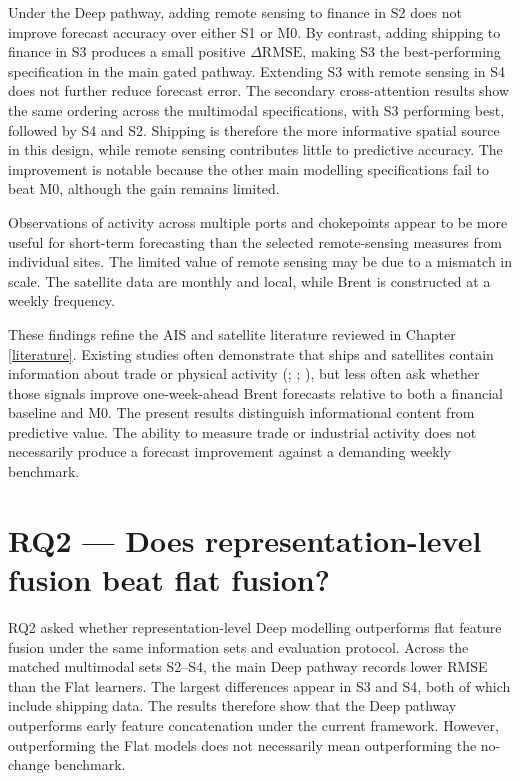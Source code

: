 \documentclass[
  british,
  12pt,
  oneside]{book}
\begin{document}
Under the Deep pathway, adding remote sensing to finance in S2 does not improve forecast accuracy over either S1 or M0. By contrast, adding shipping to finance in S3 produces a small positive \(\Delta\mathrm{RMSE}\), making S3 the best-performing specification in the main gated pathway. Extending S3 with remote sensing in S4 does not further reduce forecast error. The secondary cross-attention results show the same ordering across the multimodal specifications, with S3 performing best, followed by S4 and S2. Shipping is therefore the more informative spatial source in this design, while remote sensing contributes little to predictive accuracy. The improvement is notable because the other main modelling specifications fail to beat M0, although the gain remains limited.

Observations of activity across multiple ports and chokepoints appear to be more useful for short-term forecasting than the selected remote-sensing measures from individual sites. The limited value of remote sensing may be due to a mismatch in scale. The satellite data are monthly and local, while Brent is constructed at a weekly frequency.

These findings refine the AIS and satellite literature reviewed in Chapter \ref{literature}. Existing studies often demonstrate that ships and satellites contain information about trade or physical activity (; ; ), but less often ask whether those signals improve one-week-ahead Brent forecasts relative to both a financial baseline and M0. The present results distinguish informational content from predictive value. The ability to measure trade or industrial activity does not necessarily produce a forecast improvement against a demanding weekly benchmark.

\section{RQ2 --- Does representation-level fusion beat flat fusion?}\label{discussion-rq2}

RQ2 asked whether representation-level Deep modelling outperforms flat feature fusion under the same information sets and evaluation protocol. Across the matched multimodal sets S2--S4, the main Deep pathway records lower RMSE than the Flat learners. The largest differences appear in S3 and S4, both of which include shipping data. The results therefore show that the Deep pathway outperforms early feature concatenation under the current framework. However, outperforming the Flat models does not necessarily mean outperforming the no-change benchmark.
\end{document}
